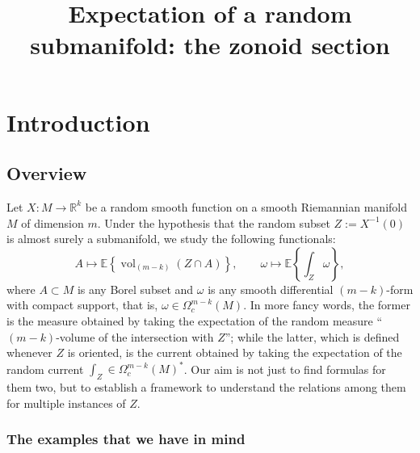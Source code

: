 \documentclass[AHL, Unicode, longabstracts, published]{cedram}
\title[Expectation of a random submanifold]{Expectation of a random submanifold: the zonoid section}
\author[\initial{L.} \lastname{Mathis}]{\firstname{Léo} \lastname{Mathis}}
\author[\initial{M.} \lastname{Stecconi}]{\firstname{Michele} \lastname{Stecconi}}
\newcommand{\R}{\mathbb{R}}
\newcommand{\EE}{\mathbb{E}}
\DeclareMathOperator{\vol}{vol}
\begin{document}
\maketitle

\section{Introduction}\label{sec:intro}
\subsection{Overview}

Let $X\colon M\to \R^k$ be a random smooth function on a smooth Riemannian manifold $M$ of dimension $m$. Under the hypothesis that the random subset $Z:=X^{-1}(0)$ is almost surely a submanifold, we study the following functionals:
\begin{equation}\label{eq:rhoalpha1}
A\mapsto\EE\left\{\vol_{(m-k)}(Z\cap A)\right\}, \qquad \omega\mapsto \EE\left\{\int_{Z} \omega\right\},
\end{equation}
where $A\subset M$ is any Borel subset and $\omega$ is any smooth differential $(m-k)$-form with compact support, that is, $\omega\in \Omega_c^{m-k}(M)$. In more fancy words, the former is the measure obtained by taking the expectation of the random measure ``$(m-k)$-volume of the intersection with $Z$''; while the latter, which is defined whenever $Z$ is oriented, is the current obtained by taking the expectation of the random current $\int_Z\in \Omega_c^{m-k}(M)^*$. Our aim is not just to find formulas for them two, but to establish a framework to understand the relations among them for multiple instances of $Z$.

\subsubsection{The examples that we have in mind}\label{subsub:exmind}
\end{document}
